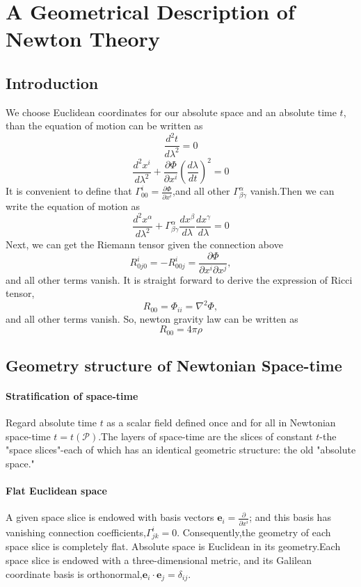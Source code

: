 \chapter{A Geometrical Description of Newton Theory}
\section{Introduction}
\noindent
We choose Euclidean coordinates for our absolute space and an absolute time $t$, than the equation of motion can be written as
\[\frac{d^2 t}{d\lambda^2} = 0\]
\[\frac{d^2 x^i}{d\lambda^2} + \frac{\partial \Phi}{\partial x^i} (\frac{d\lambda}{dt})^2=0\]
It is convenient to define that $\Gamma^i_{00} = \frac{\partial \Phi}{\partial x^i}$,and all other $\Gamma^{\alpha}_{\beta \gamma}$ vanish.Then we can write the equation of motion as
\[\frac{d^2 x^{\alpha}}{d\lambda^2} + \Gamma^{\alpha}_{\beta \gamma} \frac{dx^{\beta}}{d \lambda} \frac{dx^{\gamma}}{d \lambda}=0\]
Next, we can get the Riemann tensor given the connection above\[
R^i_{0j0} = -R^i_{00j} = \frac{\partial \Phi}{\partial x^i \partial x^j},
\]and all other terms vanish. It is straight forward to derive the expression of Ricci tensor,
\[R_{00} = \Phi_{ii} = \nabla^2\Phi,\]and all other terms vanish.
So, newton gravity law can be written as
\[R_{00} = 4\pi\rho\]

\section{Geometry structure of Newtonian Space-time}
\subsubsection{Stratification of space-time}
Regard absolute time $t$ as a scalar field defined once and for all in Newtonian space-time $t=t(\mathcal{P})$.The layers of space-time are the slices of constant $t$-the "space slices"-each of which has an identical geometric structure: the old "absolute space."

\subsubsection{Flat Euclidean space}
A given space slice is endowed with basis vectors $\bm{e}_i = \frac{\partial}{\partial x^i}$; and this basis has vanishing connection coefficients,$\Gamma^i_{jk} = 0$. Consequently,the geometry of each space slice is completely flat. Absolute space is Euclidean in its geometry.Each space slice is endowed with a three-dimensional metric, and its Galilean coordinate basis is orthonormal,$\bm{e}_i \cdot \bm{e}_j = \delta_{ij}$.

